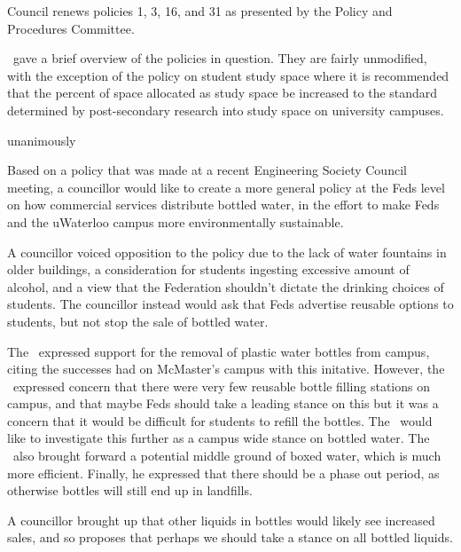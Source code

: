\begin{motion}
    \birt Council renews policies 1, 3, 16, and 31 as presented by  
    the Policy and Procedures Committee. 
    \movers{\seneca}{\brian}

    \seneca\ gave a brief overview of the policies in question. They are
    fairly unmodified, with the exception of the policy on student study
    space where it is recommended that the percent of space allocated as 
    study space be increased to the standard determined by post-secondary
    research into study space on university campuses. 

    \carries unanimously

\end{motion}

\begin{information}

    Based on a policy that was made at a recent Engineering Society Council 
    meeting, a councillor would like to create a more general policy at the 
    Feds level on how commercial services distribute bottled water, in the 
    effort to make Feds and the uWaterloo campus more environmentally
    sustainable. 

    A councillor voiced opposition to the policy due to the lack of water
    fountains in older buildings, a consideration for students 
    ingesting excessive amount of alcohol, and a view that the Federation
    shouldn't dictate the drinking choices of students. The councillor instead
    would ask that Feds advertise reusable options to students, but not 
    stop the sale of bottled water. 

    The \vpof\ expressed support for the removal of plastic water bottles from
    campus, citing the successes had on McMaster's campus with this initative. 
    However, the \vpof\ expressed concern that there were very few reusable
    bottle filling stations on campus, and that maybe Feds should take a
    leading stance on this but it was a concern that it would be difficult for
    students to refill the bottles. The \vpof\ would like to investigate this
    further as a campus wide stance on bottled water. The \vpof\ also brought 
    forward a potential middle ground of boxed water, which is much more
    efficient. Finally, he expressed that there should be a phase out period,
    as otherwise bottles will still end up in landfills. 

    A councillor brought up that other liquids in bottles would likely see
    increased sales, and so proposes that perhaps we should take a stance
    on all bottled liquids.  


\end{information}

